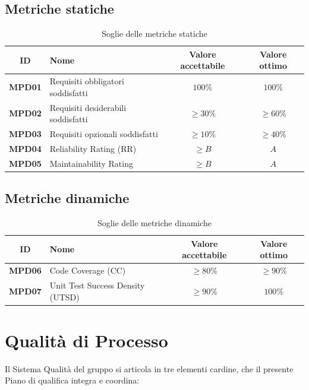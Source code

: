 \documentclass[a4paper,12pt]{article}
\begin{document}
\subsection{Metriche statiche}\label{subsec:metriche-statiche}
\begin{table}[H]
\centering
\renewcommand{\arraystretch}{1.5}
\begin{tabularx}{\textwidth}{|c|Y|c|c|}
\hline
     \textbf{ID} & \textbf{Nome} & \textbf{Valore accettabile} & \textbf{Valore ottimo} \\ \hline
    \textbf{MPD01} & Requisiti obbligatori soddisfatti & $100\%$ & $100\%$ \\ \hline
    \textbf{MPD02} & Requisiti desiderabili soddisfatti & $\ge 30\%$ & $\ge 60\%$ \\ \hline
    \textbf{MPD03} & Requisiti opzionali soddisfatti & $\ge 10\%$ & $\ge 40\%$ \\ \hline
    \textbf{MPD04} & Reliability Rating (RR) & $\ge B$ & $A$ \\ \hline
    \textbf{MPD05} & Maintainability Rating & $\ge B$ & $A$ \\ \hline
\end{tabularx}
\caption{Soglie delle metriche statiche}
\end{table}

\subsection{Metriche dinamiche}\label{subsec:metriche-dinamiche}
\begin{table}[H]
\centering
\renewcommand{\arraystretch}{1.5}
\begin{tabularx}{\textwidth}{|c|Y|c|c|}
\hline
{} \textbf{ID} & \textbf{Nome} & \textbf{Valore accettabile} & \textbf{Valore ottimo} \\ \hline
\textbf{MPD06} & Code Coverage (CC) & $\ge80\%$ & $\ge90\%$ \\ \hline
\textbf{MPD07} & Unit Test Success Density (UTSD) & $\ge 90\%$ & $100\%$ \\ \hline
\end{tabularx}
\caption{Soglie delle metriche dinamiche}
\end{table}

\section{Qualità di Processo}\label{sec:qualità_processo}
Il Sistema Qualità del gruppo si articola in tre elementi cardine, che il presente Piano di qualifica integra e coordina:
\end{document}
